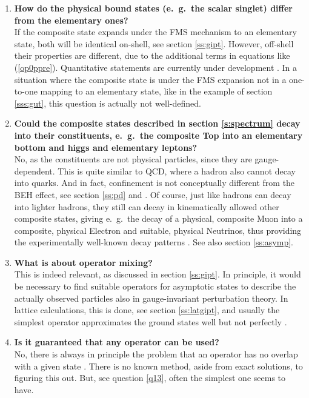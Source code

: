 \documentclass[final,12pt]{article}
\newcommand*{\pref}[1]{(\ref{#1})}
\newcommand*{\1}{1\!\!\!\bot}
\begin{document}
\begin{enumerate}
 \item {\bf How do the physical bound states (e.\ g.\ the scalar singlet) differ from the elementary ones?}\\
 If the composite state expands under the FMS mechanism to an elementary state, both will be identical on-shell, see section \ref{ss:gipt}. However, off-shell their properties are different, due to the additional terms in equations like \pref{op0ppre}. Quantitative statements are currently under development \cite{Raubitzek:unpublished,Maas:unpublished}. In a situation where the composite state is under the FMS expansion not in a one-to-one mapping to an elementary state, like in the example of section \ref{sss:gut}, this question is actually not well-defined.
 
 \item {\bf Could the composite states described in section \ref{s:spectrum} decay into their constituents, e.\ g.\ the composite Top into an elementary bottom and higgs and elementary leptons?}\\
 No, as the constituents are not physical particles, since they are gauge-dependent. This is quite similar to QCD, where a hadron also cannot decay into quarks. And in fact, confinement is not conceptually different from the BEH effect, see section \ref{ss:pd} and \cite{Osterwalder:1977pc,Seiler:2015rwa,Fradkin:1978dv}. Of course, just like hadrons can decay into lighter hadrons, they still can decay in kinematically allowed other composite states, giving e.\ g.\ the decay of a physical, composite Muon into a composite, physical Electron and suitable, physical Neutrinos, thus providing the experimentally well-known decay patterns \cite{pdg}. See also section \ref{ss:asymp}.
 
 \item\label{q13} {\bf What is about operator mixing?}\\
 This is indeed relevant, as discussed in section \ref{ss:gipt}. In principle, it would be necessary to find suitable operators for asymptotic states to describe the actually observed particles also in gauge-invariant perturbation theory. In lattice calculations, this is done, see section \ref{ss:latgipt}, and usually the simplest operator approximates the ground states well \cite{Wurtz:2013ova,Maas:2014pba,Maas:unpublishedtoerek} but not perfectly \cite{Raubitzek:unpublished}.
 
 \item {\bf Is it guaranteed that any operator can be used?}\\
 No, there is always in principle the problem that an operator has no overlap with a given state \cite{Gattringer:2010zz,DeGrand:2006zz}. There is no known method, aside from exact solutions, to figuring this out. But, see question \ref{q13}, often the simplest one seems to have.
 

\end{enumerate}
\end{document}
